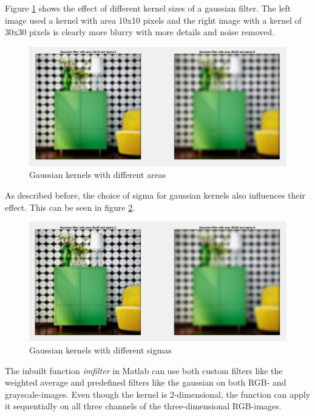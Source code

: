 Figure \ref{fig:task13} shows the effect of different kernel sizes of a gaussian filter. The left image used a kernel with area 10x10 pixels and the right image with a kernel of 30x30 pixels is clearly more blurry with more details and noise removed.

\begin{figure}[!hbt]
  \includegraphics[width=\textwidth]{./img/task13.png}
  \caption{Gaussian kernels with different areas}
  \label{fig:task13}
\end{figure}

As described before, the choice of sigma for gaussian kernels also influences their effect. This can be seen in figure \ref{fig:task14}.

\begin{figure}[!hbt]
  \includegraphics[width=\textwidth]{./img/task14.png}
  \caption{Gaussian kernels with different sigmas}
  \label{fig:task14}
\end{figure}

The inbuilt function \textit{imfilter} in Matlab can use both custom filters like the weighted average and predefined filters like the gaussian on both RGB- and grayscale-images. Even though the kernel is 2-dimensional, the function can apply it sequentially on all three channels of the three-dimensional RGB-images.

